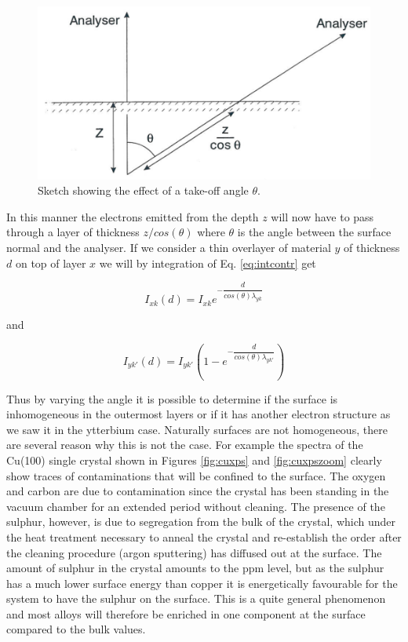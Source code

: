 \begin{figure}[h!]
	\begin{center}
	\includegraphics[scale=3]{figures/04_24.png}
	\caption{Sketch showing the effect of a take-off angle $\theta$.}
	\label{fig:angle}
	\end{center}
\end{figure}

In this manner the electrons emitted from the depth $z$ will now have to pass through a layer of thickness $z/cos(\theta)$ where $\theta$ is the angle between the surface normal and the analyser. If we consider a thin overlayer of material $y$ of thickness $d$ on top of layer $x$ we will by integration of Eq. \eqref{eq:intcontr} get 

\begin{equation}\label{eq:intang}
I_{xk}(d)=I_{xk}e^{-\dfrac{d}{cos(\theta)\lambda_{yk}}}
\end{equation}

\noindent and

\begin{equation}
I_{yk\prime}(d)=I_{yk\prime}\left(1-e^{-\dfrac{d}{cos(\theta)\lambda_{yk\prime}}}\right)
\end{equation}

Thus by varying the angle it is possible to determine if the surface is inhomogeneous in the outermost layers or if it has another electron structure as we saw it in the ytterbium case. Naturally surfaces are not homogeneous, there are several reason why this is not the case. For example the spectra of the Cu(100) single crystal shown in Figures \ref{fig:cuxps} and \ref{fig:cuxpszoom} clearly show traces of contaminations that will be confined to the surface. The oxygen and carbon are due to contamination since the crystal has been standing in the vacuum chamber for an extended period without cleaning. The presence of the sulphur, however, is due to segregation from the bulk of the crystal, which under the heat treatment necessary to anneal the crystal and re-establish the order after the cleaning procedure (argon sputtering) has diffused out at the surface. The amount of sulphur in the crystal amounts to the ppm level, but as the sulphur has a much lower surface energy than copper it is energetically favourable for the system to have the sulphur on the surface. This is a quite general phenomenon and most alloys will therefore be enriched in one component at the surface compared to the bulk values.


